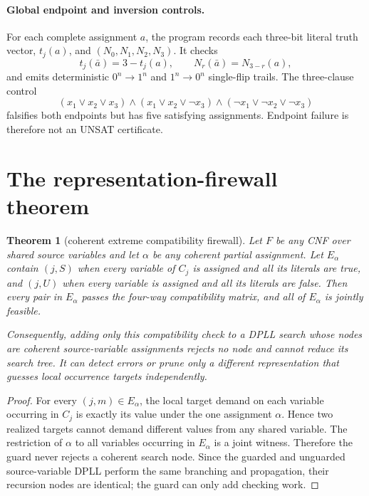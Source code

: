 \documentclass[10pt]{article}
\newtheorem{theorem}{Theorem}
\begin{document}
\paragraph{Global endpoint and inversion controls.}
For each complete assignment $a$, the program records each three-bit literal truth
vector, $t_j(a)$, and $(N_0,N_1,N_2,N_3)$.  It checks
\[
 t_j(\bar a)=3-t_j(a),\qquad N_r(\bar a)=N_{3-r}(a),
\]
and emits deterministic $0^n\to1^n$ and $1^n\to0^n$ single-flip trails.  The
three-clause control
\[
 (x_1\vee x_2\vee x_3)\wedge
 (x_1\vee x_2\vee\neg x_3)\wedge
 (\neg x_1\vee\neg x_2\vee\neg x_3)
\]
falsifies both endpoints but has five satisfying assignments.  Endpoint failure is
therefore not an UNSAT certificate.

\section{The representation-firewall theorem}

\begin{theorem}[coherent extreme compatibility firewall]\label{thm:firewall}
Let $F$ be any CNF over shared source variables and let $\alpha$ be any coherent
partial assignment.  Let $E_\alpha$ contain $(j,S)$ when every variable of $C_j$
is assigned and all its literals are true, and $(j,U)$ when every variable is
assigned and all its literals are false.  Then every pair in $E_\alpha$ passes the
four-way compatibility matrix, and all of $E_\alpha$ is jointly feasible.

Consequently, adding only this compatibility check to a DPLL search whose nodes are
coherent source-variable assignments rejects no node and cannot reduce its search
tree.  It can detect errors or prune only a different representation that guesses
local occurrence targets independently.
\end{theorem}

\begin{proof}
For every $(j,m)\in E_\alpha$, the local target demand on each variable occurring
in $C_j$ is exactly its value under the one assignment $\alpha$.  Hence two realized
targets cannot demand different values from any shared variable.  The restriction
of $\alpha$ to all variables occurring in $E_\alpha$ is a joint witness.  Therefore
the guard never rejects a coherent search node.  Since the guarded and unguarded
source-variable DPLL perform the same branching and propagation, their recursion
nodes are identical; the guard can only add checking work.  \qedhere
\end{proof}
\end{document}
